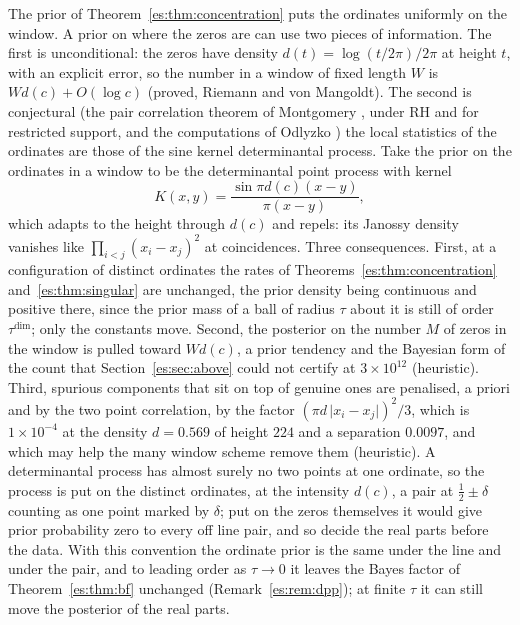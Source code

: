 The prior of Theorem~\ref{es:thm:concentration} puts the ordinates uniformly on the window. A prior on where the zeros are can use two pieces of information. The first is unconditional: the zeros have density $d(t)=\log(t/2\pi)/2\pi$ at height $t$, with an explicit error, so the number in a window of fixed length $W$ is $Wd(c)+O(\log c)$ (proved, Riemann and von Mangoldt). The second is conjectural (the pair correlation theorem of Montgomery \cite{Montgomery73}, under RH and for restricted support, and the computations of Odlyzko \cite{Odlyzko87}) the local statistics of the ordinates are those of the sine kernel determinantal process. Take the prior on the ordinates in a window to be the determinantal point process with kernel
\[
K(x,y)=\frac{\sin\pi d(c)(x-y)}{\pi(x-y)},
\]
which adapts to the height through $d(c)$ and repels: its Janossy density vanishes like $\prod_{i<j}(x_i-x_j)^2$ at coincidences. Three consequences. First, at a configuration of distinct ordinates the rates of Theorems~\ref{es:thm:concentration} and~\ref{es:thm:singular} are unchanged, the prior density being continuous and positive there, since the prior mass of a ball of radius $\tau$ about it is still of order $\tau^{\dim}$; only the constants move. Second, the posterior on the number $M$ of zeros in the window is pulled toward $Wd(c)$, a prior tendency and the Bayesian form of the count that Section~\ref{es:sec:above} could not certify at $3\times10^{12}$ (heuristic). Third, spurious components that sit on top of genuine ones are penalised, a priori and by the two point correlation, by the factor $(\pi d\,\lvert x_i-x_j\rvert)^2/3$, which is $1\times10^{-4}$ at the density $d=0.569$ of height $224$ and a separation $0.0097$, and which may help the many window scheme remove them (heuristic). A determinantal process has almost surely no two points at one ordinate, so the process is put on the distinct ordinates, at the intensity $d(c)$, a pair at $\tfrac12\pm\delta$ counting as one point marked by $\delta$; put on the zeros themselves it would give prior probability zero to every off line pair, and so decide the real parts before the data. With this convention the ordinate prior is the same under the line and under the pair, and to leading order as $\tau\to0$ it leaves the Bayes factor of Theorem~\ref{es:thm:bf} unchanged (Remark~\ref{es:rem:dpp}); at finite $\tau$ it can still move the posterior of the real parts.


